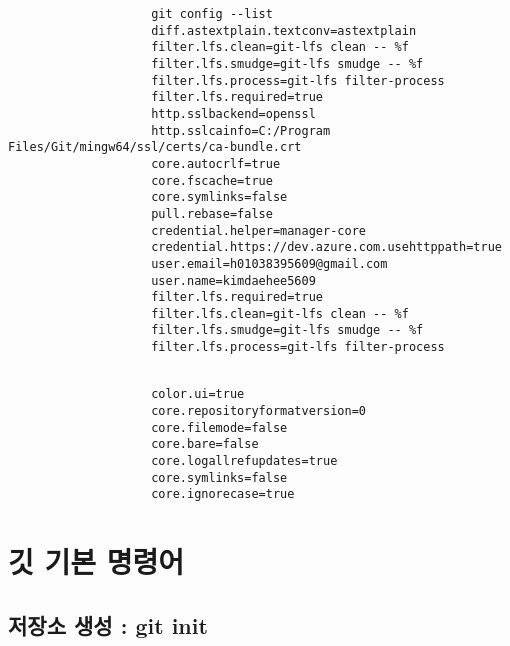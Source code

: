 \documentclass[12pt, a4paper, oneside]{book}
\let\stdsection\section
\renewcommand\section{\newpage\stdsection}
\begin{document}
			\begin{tcolorbox}		[
									title=커밋 config 확인
								]
				\begin{verbatim}
					git config --list
					diff.astextplain.textconv=astextplain
					filter.lfs.clean=git-lfs clean -- %f
					filter.lfs.smudge=git-lfs smudge -- %f
					filter.lfs.process=git-lfs filter-process
					filter.lfs.required=true
					http.sslbackend=openssl
					http.sslcainfo=C:/Program Files/Git/mingw64/ssl/certs/ca-bundle.crt
					core.autocrlf=true
					core.fscache=true
					core.symlinks=false
					pull.rebase=false
					credential.helper=manager-core
					credential.https://dev.azure.com.usehttppath=true
					user.email=h01038395609@gmail.com
					user.name=kimdaehee5609
					filter.lfs.required=true
					filter.lfs.clean=git-lfs clean -- %f
					filter.lfs.smudge=git-lfs smudge -- %f
					filter.lfs.process=git-lfs filter-process
				\end{verbatim}
			\end{tcolorbox}

			\begin{tcolorbox}		[
									title=커밋 config 확인
								]
				\begin{verbatim}

					color.ui=true
					core.repositoryformatversion=0
					core.filemode=false
					core.bare=false
					core.logallrefupdates=true
					core.symlinks=false
					core.ignorecase=true
				\end{verbatim}
			\end{tcolorbox}







	
	\chapter {깃 기본 명령어}
	\noptcrule




%	
	\section 	{저장소 생성 :  git init}
\end{document}
